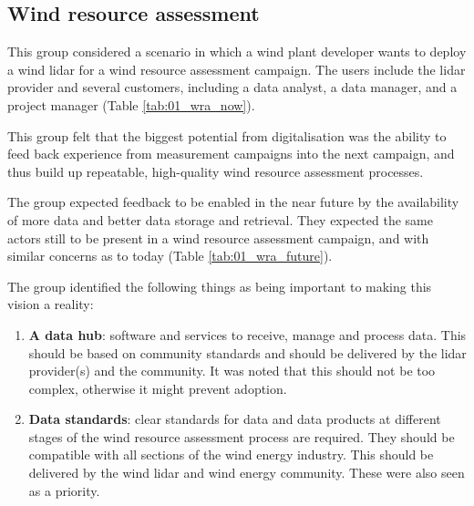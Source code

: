 \subsection{Wind resource assessment}

This group considered a scenario in which a wind plant developer wants to deploy a wind lidar for a wind resource assessment campaign. The users include the lidar provider and several customers, including a data analyst, a data manager, and a project manager (Table \ref{tab:01_wra_now}).

This group felt that the biggest potential from digitalisation was the ability to feed back experience from measurement campaigns into the next campaign, and thus build up repeatable, high-quality wind resource assessment processes.

The group expected feedback to be enabled in the near future by the availability of more data and better data storage and retrieval. They expected the same actors still to be present in a wind resource assessment campaign, and with similar concerns as to today (Table \ref{tab:01_wra_future}).

The group identified the following things as being important to making this vision a reality:

\begin{enumerate}
\item
  \textbf{A data hub}: software and services to receive, manage and
  process data. This should be based on community standards and should
  be delivered by the lidar provider(s) and the community. It was noted
  that this should not be too complex, otherwise it might prevent
  adoption.
\item
  \textbf{Data standards}: clear standards for data and data products at
  different stages of the wind resource assessment process are required.
  They should be compatible with all sections of the wind energy
  industry. This should be delivered by the wind lidar and wind energy
  community. These were also seen as a priority.
\end{enumerate}
